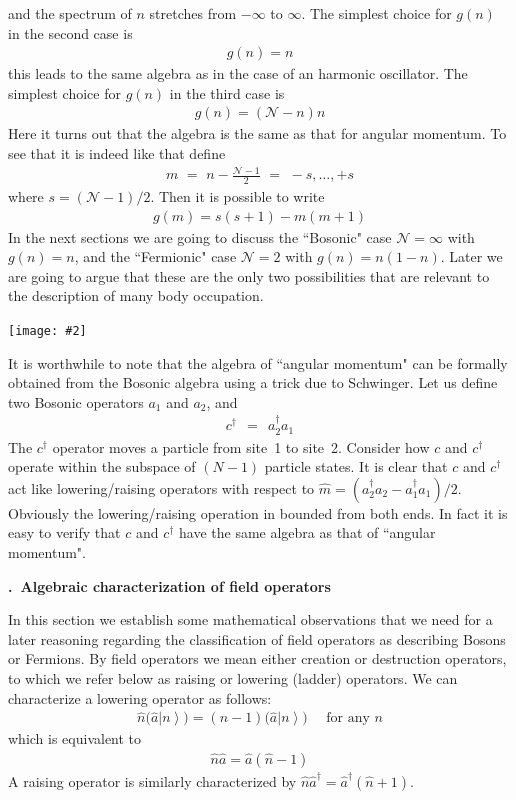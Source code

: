 \documentclass[onecolumn,fleqn, 11pt]{revtex4}
\newcommand{\putgraph}[2][0.30\hsize]{\texttt{[image: \#2]}}
\newcommand{\beq}{\begin{eqnarray}}
\newcommand{\eeq}{\end{eqnarray}}
\renewcommand{\thesubsection}{\arabic{subsection}}
\renewcommand{\thesubsubsection}{\arabic{subsubsection}}
\newcommand{\sheadC}[1]
{
\addtocounter{subsubsection}{1}
\vspace{5mm}
{\bf \thesubsection.\thesubsubsection \ #1}  
\nopagebreak
\phantomsection
}
\begin{document}
and the spectrum of $n$ stretches from $-\infty$ to $\infty$. 
The simplest choice for $g(n)$ in the second case is 
\beq
g(n)=n
\eeq
this leads to the same algebra as in the case of an harmonic 
oscillator.  The simplest choice for $g(n)$ in the third case is 
\beq
g(n)=(\mathcal{N}-n)n
\eeq
Here it turns out that the algebra  
is the same as that for angular momentum. 
To see that it is indeed like that define 
\beq
m \,\,=\,\, n - \frac{\mathcal{N}-1}{2} \,\,=\,\, -s, \dots ,+s
\eeq
where $s=(\mathcal{N}-1)/2$.
Then it is possible to write 
\beq
g(m)  = s(s+1)-m(m+1)  
\eeq
In the next sections we are going to discuss 
the ``Bosonic" case $\mathcal{N}=\infty$ with $g(n)=n$, 
and the ``Fermionic" case $\mathcal{N}=2$ with $g(n)=n(1-n)$. 
Later we are going to argue that these are the 
only two possibilities that are relevant to the 
description of many body occupation. 

\begin{center}
\putgraph[0.55\hsize]{SecondQuantization}
\end{center}


It is worthwhile to note that the algebra of ``angular momentum" 
can be formally obtained from the Bosonic algebra 
using a trick due to Schwinger.  
Let us define two Bosonic operators $a_1$ and $a_2$, and  
\beq
c^{\dag} \ \ = \ \ a_2^{\dag}a_1
\eeq
The $c^{\dag}$ operator moves a particle from site~1 
to site~2. Consider how $c$ and $c^{\dag}$  
operate within the subspace of $(N-1)$ particle states. 
It is clear that $c$ and $c^{\dag}$ act 
like lowering/raising operators with respect 
to $\hat{m} = (a_2^{\dag}a_2 - a_1^{\dag}a_1)/2$.
Obviously the lowering/raising operation in 
bounded from both ends. In fact it is easy 
to verify that $c$ and $c^{\dag}$ have the same 
algebra as that of ``angular momentum".   
 



\sheadC{Algebraic characterization of field operators} 

In this section we establish some 
mathematical observations that we 
need for a later reasoning regarding 
the classification of field operators   
as describing Bosons or Fermions.
By field operators we mean either 
creation or destruction operators, 
to which we refer below 
as raising or lowering (ladder) operators.    
We can characterize a lowering operator as follows:  
\beq
\hat{n}\Big(  \hat{a}\left\vert n\right\rangle \Big)  
=(n-1) \Big(  \hat{a}\left\vert n\right\rangle \Big) 
\ \ \ \ \ \ \mbox{for any $n$} 
\eeq
which is equivalent to  
\beq
\hat{n}\hat{a} = \hat{a}(\hat{n}-1)  
\eeq
A raising operator is similarly 
characterized by ${\hat{n}\hat{a}^{\dag} = \hat{a}^{\dag}(\hat{n}+1)}$.  
\end{document}
